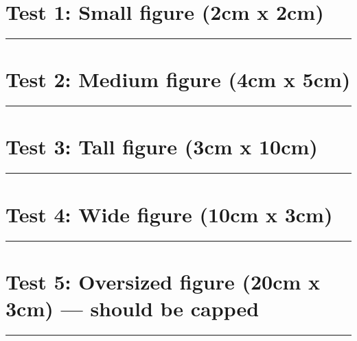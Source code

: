 \documentclass[11pt,a4paper]{article}
\begin{document}
\section{Test 1: Small figure (2cm x 2cm)}
\begin{simplewrap}%
  \begin{minipage}[t]{2cm}
    \centering
    \textcolor{blue!60}{\rule{\linewidth}{2cm}}
  \end{minipage}%
\end{simplewrap}%
\lipsum[1]\lipsum[2]

\section{Test 2: Medium figure (4cm x 5cm)}
\begin{simplewrap}%
  \begin{minipage}[t]{4cm}
    \centering
    \textcolor{red!60}{\rule{\linewidth}{5cm}}
  \end{minipage}%
\end{simplewrap}%
\lipsum[1]\lipsum[2]\lipsum[3]

\section{Test 3: Tall figure (3cm x 10cm)}
\begin{simplewrap}%
  \begin{minipage}[t]{3cm}
    \centering
    \textcolor{green!60!black}{\rule{\linewidth}{10cm}}
  \end{minipage}%
\end{simplewrap}%
\lipsum[1]\lipsum[2]\lipsum[3]\lipsum[4]

\section{Test 4: Wide figure (10cm x 3cm)}
\begin{simplewrap}%
  \begin{minipage}[t]{10cm}
    \centering
    \textcolor{orange}{\rule{\linewidth}{3cm}}
  \end{minipage}%
\end{simplewrap}%
\lipsum[1]\lipsum[2]

\section{Test 5: Oversized figure (20cm x 3cm) — should be capped}
\begin{simplewrap}%
  \begin{minipage}[t]{20cm}
    \centering
    \textcolor{purple}{\rule{\linewidth}{3cm}}
  \end{minipage}%
\end{simplewrap}%
\lipsum[1]
\end{document}
